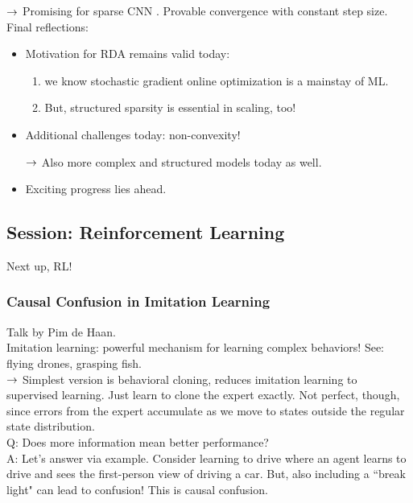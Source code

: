 $\rightarrow$ Promising for sparse CNN \cite{jia2018irda}. Provable convergence with constant step size. \\

Final reflections:
\begin{itemize}
    \item Motivation for RDA remains valid today:
    \begin{enumerate}
        \item we know stochastic gradient online optimization is a mainstay of ML.
        \item But, structured sparsity is essential in scaling, too!
    \end{enumerate} 
    \item Additional challenges today: non-convexity!
    
    $\rightarrow$ Also more complex and structured models today as well.
    
    \item Exciting progress lies ahead.
\end{itemize}

\spacerule



\subsection{Session: Reinforcement Learning}
Next up, RL!

\subsubsection{Causal Confusion in Imitation Learning \cite{de2019causal}}


Talk by Pim de Haan. \\

Imitation learning: powerful mechanism for learning complex behaviors! See: flying drones, grasping fish. \\

$\rightarrow$ Simplest version is behavioral cloning, reduces imitation learning to supervised learning. Just learn to clone the expert exactly. Not perfect, though, since errors from the expert accumulate as we move to states outside the regular state distribution. \\

Q: Does more information mean better performance? \\

A: Let's answer via example. Consider learning to drive where an agent learns to drive and sees the first-person view of driving a car. But, also including a ``break light" can lead to confusion! This is causal confusion. \\


